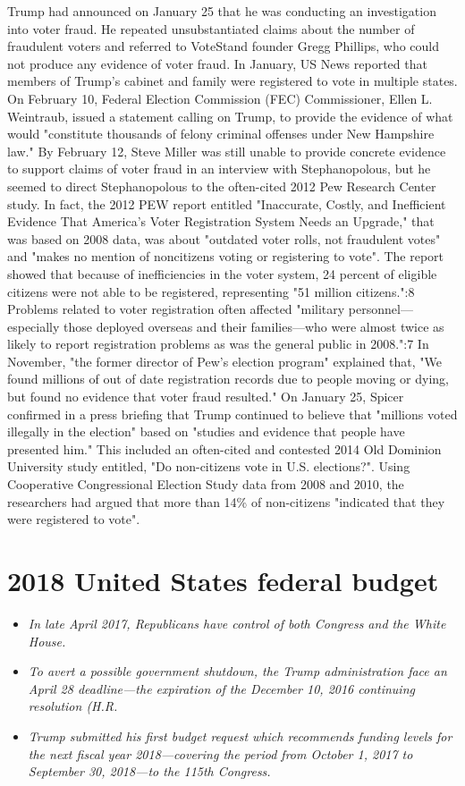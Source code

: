 Trump had announced on January 25 that he was conducting an
investigation into voter fraud. He repeated unsubstantiated claims about
the number of fraudulent voters and referred to VoteStand founder Gregg
Phillips, who could not produce any evidence of voter fraud. In January,
US News reported that members of Trump's cabinet and family were
registered to vote in multiple states. On February 10, Federal Election
Commission (FEC) Commissioner, Ellen L. Weintraub, issued a statement
calling on Trump, to provide the evidence of what would "constitute
thousands of felony criminal offenses under New Hampshire law." By
February 12, Steve Miller was still unable to provide concrete evidence
to support claims of voter fraud in an interview with Stephanopolous,
but he seemed to direct Stephanopolous to the often-cited 2012 Pew
Research Center study. In fact, the 2012 PEW report entitled
"Inaccurate, Costly, and Inefficient Evidence That America's Voter
Registration System Needs an Upgrade," that was based on 2008 data, was
about "outdated voter rolls, not fraudulent votes" and "makes no mention
of noncitizens voting or registering to vote". The report showed that
because of inefficiencies in the voter system, 24 percent of eligible
citizens were not able to be registered, representing "51 million
citizens.":8 Problems related to voter registration often affected
"military personnel---especially those deployed overseas and their
families---who were almost twice as likely to report registration
problems as was the general public in 2008.":7 In November, "the former
director of Pew's election program" explained that, "We found millions
of out of date registration records due to people moving or dying, but
found no evidence that voter fraud resulted." On January 25, Spicer
confirmed in a press briefing that Trump continued to believe that
"millions voted illegally in the election" based on "studies and
evidence that people have presented him." This included an often-cited
and contested 2014 Old Dominion University study entitled, "Do
non-citizens vote in U.S. elections?". Using Cooperative Congressional
Election Study data from 2008 and 2010, the researchers had argued that
more than 14\% of non-citizens "indicated that they were registered to
vote".

\section{2018 United States federal
budget}\label{united-states-federal-budget}

\begin{itemize}
\item
  \emph{In late April 2017, Republicans have control of both Congress
  and the White House.}
\item
  \emph{To avert a possible government shutdown, the Trump
  administration face an April 28 deadline---the expiration of the
  December 10, 2016 continuing resolution (H.R.}
\item
  \emph{Trump submitted his first budget request which recommends
  funding levels for the next fiscal year 2018---covering the period
  from October 1, 2017 to September 30, 2018---to the 115th Congress.}
\end{itemize}

